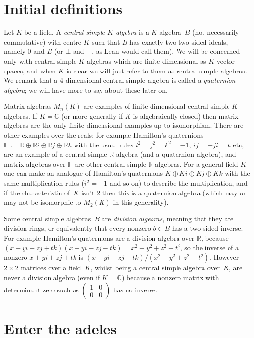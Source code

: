 \documentclass[10pt,a4paper]{article}
\newcommand{\R}{\mathbb{R}}
\newcommand{\bbC}{\mathbb{C}}
\newcommand{\bbH}{\mathbb{H}}
\begin{document}
\section{Initial definitions}

Let $K$ be a field. A \emph{central simple $K$-algebra} is a $K$-algebra~$B$ (not necessarily
commutative) with centre $K$ such that $B$ has exactly two two-sided ideals, namely ${0}$ and $B$
(or $\bot$ and $\top$, as Lean would call them). We will be concerned
only with central simple $K$-algebras which are finite-dimensional as $K$-vector spaces, and
when $K$ is clear we will just refer to them as central simple algebras. We remark that a
4-dimensional central simple algebra is called a \emph{quaternion algebra}; we will have
more to say about these later on.

Matrix algebras $M_n(K)$ are examples of finite-dimensional central simple $K$-algebras.
If $K=\bbC$ (or more generally if $K$ is algebraically closed)
then matrix algebras are the only finite-dimensional examples
up to isomorphism. There are other examples over the reals: for example Hamilton's quaternions
$\bbH:=\R\oplus\R i\oplus\R j\oplus\R k$ with the usual rules $i^2=j^2=k^2=-1$,
$ij=-ji=k$ etc, are an example of a central simple $\R$-algebra (and a quaternion algebra), and
matrix algebras over $\bbH$ are other central simple $\R$-algebras.
For a general field $K$
one can make an analogue of Hamilton's quaternions $K\oplus Ki\oplus Kj\oplus Kk$ with the
same multiplication rules ($i^2=-1$ and so on) to describe the multiplication, and if the characteristic
of~$K$ isn't 2
then this is a quaternion algebra (which may or may not be isomorphic to $M_2(K)$ in this
generality).

Some central simple algebras~$B$ are \emph{division algebras}, meaning that they are division
rings, or equivalently that every nonzero $b\in B$ has a two-sided inverse. For example
Hamilton's quaternions are a division algebra over $\R$,
because $(x+yi+zj+tk)(x-yi-zj-tk)=x^2+y^2+z^2+t^2$, so the inverse
of a nonzero $x+yi+zj+tk$ is $(x-yi-zj-tk)/(x^2+y^2+z^2+t^2)$.
However $2\times 2$ matrices over a field~$K$, whilst being a central simple algebra
over~$K$, are never a division algebra
(even if $K=\bbC$) because a nonzero matrix with determinant zero such as
$\begin{pmatrix}1&0\\0&0\end{pmatrix}$ has no inverse.

\section{Enter the adeles}
\end{document}
